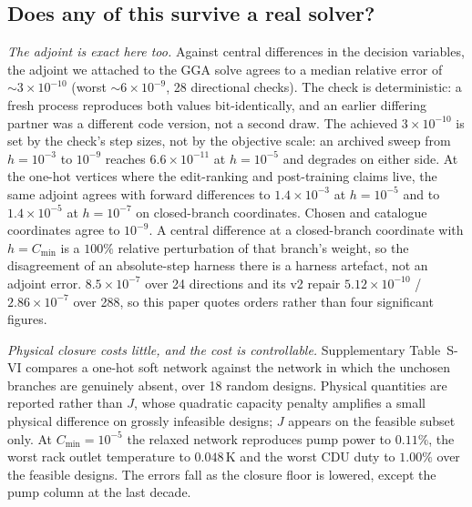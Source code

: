 \documentclass[journal]{IEEEtran}
\newcommand{\Jobj}{J}
\begin{document}
\subsection{Does any of this survive a real solver?}
\label{sec:e0lc}
\emph{The adjoint is exact here too.}  Against central differences in the decision
variables, the adjoint we attached to the GGA solve agrees to a median relative error
of $\sim3\times10^{-10}$ (worst $\sim6\times10^{-9}$, 28 directional checks). The check is deterministic: a fresh process reproduces both values
bit-identically, and an earlier differing partner was a different code version,
not a second draw.  The achieved $3\times10^{-10}$ is set by the check's step sizes, not by the
objective scale: an archived sweep from $h=10^{-3}$ to $10^{-9}$ reaches
$6.6\times10^{-11}$ at $h=10^{-5}$ and degrades on either side.  At the one-hot
vertices where the edit-ranking and post-training claims live, the same adjoint
agrees with forward differences to $1.4\times10^{-3}$ at $h=10^{-5}$ and to
$1.4\times10^{-5}$ at $h=10^{-7}$ on closed-branch coordinates. Chosen and catalogue coordinates agree to $10^{-9}$.  A central difference at a
closed-branch coordinate with $h=C_{\min}$ is a $100\%$ relative perturbation of
that branch's weight, so the disagreement of an absolute-step harness there is a
harness artefact, not an adjoint error.
$8.5\times10^{-7}$ over 24 directions and its v2 repair $5.12\times10^{-10}$ /
$2.86\times10^{-7}$ over 288, so this paper quotes orders rather than four
significant figures.

\emph{Physical closure costs little, and the cost is controllable.}
Supplementary Table~S-VI compares a one-hot soft network against the network in which the
unchosen branches are genuinely absent, over 18 random designs.  Physical quantities
are reported rather than $\Jobj$, whose quadratic capacity penalty amplifies a small
physical difference on grossly infeasible designs; $\Jobj$ appears on the feasible
subset only.  At $C_{\min}=10^{-5}$ the relaxed network reproduces pump power to
$0.11\%$, the worst rack outlet temperature to $0.048$\,K and the worst CDU duty to
$1.00\%$ over the feasible designs.  The errors fall as the closure floor is
lowered, except the pump column at the last decade.
\end{document}
